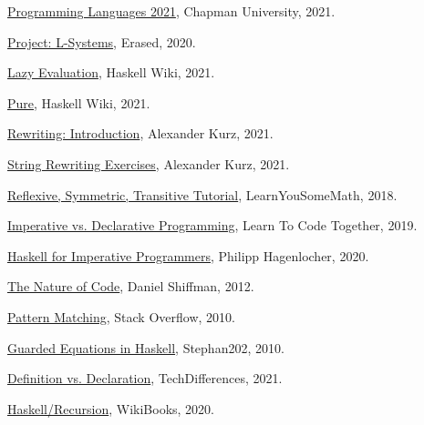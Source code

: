 \documentclass{article}
\begin{document}
\begin{thebibliography}{99}

 \href{https://github.com/alexhkurz/programming-languages-2021/blob/main/README.md}{Programming Languages 2021}, Chapman University, 2021.

 \href{https://www.erase.net/projects/l-systems/}{Project: L-Systems}, Erased, 2020.

 \href{https://wiki.haskell.org/Lazy_evaluation}{Lazy Evaluation}, Haskell Wiki, 2021.

 \href{https://wiki.haskell.org/Pure}{Pure}, Haskell Wiki, 2021.

 \href{https://hackmd.io/@alexhkurz/BJ7AoGcVK}{Rewriting: Introduction}, Alexander Kurz, 2021.

 \href{https://hackmd.io/@alexhkurz/Syn23oMHF}{String Rewriting Exercises}, Alexander Kurz, 2021.

 \href{https://www.youtube.com/watch?v=6fwJj14O_TM}{Reflexive, Symmetric, Transitive Tutorial}, LearnYouSomeMath, 2018.

 \href{https://learntocodetogether.com/imperative-vs-declarative-programming/}{Imperative vs. Declarative Programming}, Learn To Code Together, 2019.

 \href{https://www.youtube.com/watch?v=Vgu82wiiZ90&list=PLe7Ei6viL6jGp1Rfu0dil1JH1SHk9bgDV&index=1}{Haskell for Imperative Programmers}, Philipp Hagenlocher, 2020.

 \href{https://natureofcode.com/}{The Nature of Code}, Daniel Shiffman, 2012.

 \href{https://stackoverflow.com/questions/2225774/haskell-pattern-matching-what-is-it}{Pattern Matching}, Stack Overflow, 2010.

 \href{https://stackoverflow.com/questions/2225223/guarded-equations-in-haskell}{Guarded Equations in Haskell}, Stephan202, 2010.

 \href{https://techdifferences.com/difference-between-definition-and-declaration.html}{Definition vs. Declaration}, TechDifferences, 2021.

 \href{https://en.wikibooks.org/wiki/Haskell/Recursion}{Haskell/Recursion}, WikiBooks, 2020.

\end{thebibliography}
\end{document}
